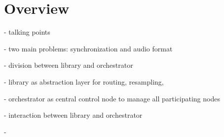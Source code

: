 

\chapter{Overview}

- talking points

- two main problems: synchronization and audio format

- division between library and orchestrator

- library as abstraction layer for routing, resampling, 

- orchestrator as central control node to manage all participating nodes

- interaction between library and orchestrator

- 
